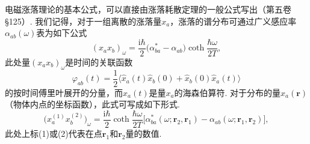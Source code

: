电磁涨落理论的基本公式，可以直接由涨落耗散定理的一般公式写出（第五卷§125）. 我们记得，对于一组离散的涨落量$x_{a}$，涨落的谱分布可通过广义感应率$\alpha_{ab}(\omega)$表为如下公式
\begin{equation*}
(x_{a}x_{b})_{\omega}=\frac{\mathrm{i}\hbar}{2}\bigl(\alpha_{ba}^{*}-\alpha_{ab}\bigr)\coth\frac{\hbar\omega}{2T},
\end{equation*}
此处量$(x_{a}x_{b})_{\omega}$是时间的关联函数
\begin{equation*}
\varphi_{ab}(t)=\frac{1}{2}\bigl\langle\hat{x}_{a}(t)\hat{x}_{b}(0)+\hat{x}_{b}(0)\hat{x}_{a}(t)\bigr\rangle
\end{equation*}
的按时间傅里叶展开的分量，而$\hat{x}_{a}(t)$是量$x_{a}$的海森伯算符. 对于分布的量$x_{a}(\bm{r})$（物体内点的坐标函数），此式可写成如下形式.
\begin{equation}
\bigl(x_{a}^{(1)}x_{b}^{(2)}\bigr)_{\omega}=\frac{\mathrm{i}\hbar}{2}\coth\frac{\hbar\omega}{2T}
\bigl[\alpha_{ba}^{*}(\omega;\bm{r}_{2},\bm{r}_{1})-\alpha_{ab}(\omega;\bm{r}_{1},\bm{r}_{2})\bigr],
\end{equation}
此处上标(1)或(2)代表在点$\bm{r}_{1}$和$\bm{r}_{2}$量的数值.

